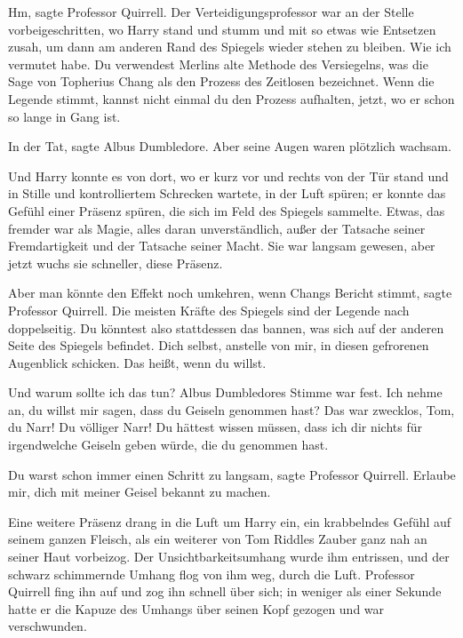 \glqq{}Hm\grqq{}, sagte Professor Quirrell. Der Verteidigungsprofessor war an der
Stelle vorbeigeschritten, wo Harry stand und stumm und mit so etwas wie
Entsetzen zusah, um dann am anderen Rand des Spiegels wieder stehen zu bleiben.
\glqq{}Wie ich vermutet habe. Du verwendest Merlins alte Methode des Versiegelns,
was die Sage von Topherius Chang als den Prozess des Zeitlosen bezeichnet. Wenn
die Legende stimmt, kannst nicht einmal du den Prozess aufhalten, jetzt, wo er
schon so lange in Gang ist.\grqq{}

\glqq{}In der Tat\grqq{}, sagte Albus Dumbledore. Aber seine Augen waren
plötzlich wachsam.

Und Harry konnte es von dort, wo er kurz vor und rechts von der Tür stand und in
Stille und kontrolliertem Schrecken wartete, in der Luft spüren; er konnte das
Gefühl einer Präsenz spüren, die sich im Feld des Spiegels sammelte. Etwas, das
fremder war als Magie, alles daran unverständlich, außer der Tatsache seiner
Fremdartigkeit und der Tatsache seiner Macht. Sie war langsam gewesen, aber
jetzt wuchs sie schneller, diese Präsenz.

\glqq{}Aber man könnte den Effekt noch umkehren, wenn Changs Bericht
stimmt\grqq{}, sagte Professor Quirrell. \glqq{}Die meisten Kräfte des Spiegels
sind der Legende nach doppelseitig. Du könntest also stattdessen das bannen, was
sich auf der anderen Seite des Spiegels befindet. Dich selbst, anstelle von mir,
in diesen gefrorenen Augenblick schicken. Das heißt, wenn du willst.\grqq{}

\glqq{}Und warum sollte ich das tun?\grqq{} Albus Dumbledores Stimme war fest.
\glqq{}Ich nehme an, du willst mir sagen, dass du Geiseln genommen hast? Das war
zwecklos, Tom, du Narr! Du völliger Narr! Du hättest wissen müssen, dass ich dir
nichts für irgendwelche Geiseln geben würde, die du genommen hast.\grqq{}

\glqq{}Du warst schon immer einen Schritt zu langsam\grqq{}, sagte Professor
Quirrell. \glqq{}Erlaube mir, dich mit meiner Geisel bekannt zu machen.\grqq{}

Eine weitere Präsenz drang in die Luft um Harry ein, ein krabbelndes Gefühl auf
seinem ganzen Fleisch, als ein weiterer von Tom Riddles Zauber ganz nah an
seiner Haut vorbeizog. Der Unsichtbarkeitsumhang wurde ihm entrissen, und der
schwarz schimmernde Umhang flog von ihm weg, durch die Luft. Professor Quirrell
fing ihn auf und zog ihn schnell über sich; in weniger als einer Sekunde hatte
er die Kapuze des Umhangs über seinen Kopf gezogen und war verschwunden.

